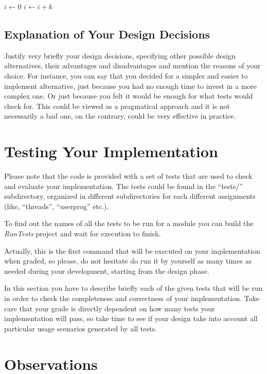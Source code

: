 \begin{algorithmic}
    \State $i\gets 0$
\Else
        \State $i\gets i+k$
    \EndIf
\EndIf
\end{algorithmic}

\subsection{Explanation of Your Design Decisions}

Justify very briefly your design decisions, specifying other possible design alternatives, their advantages and disadvantages and mention the reasons of your choice. For instance, you can say that you decided for a simpler and easier to implement alternative, just because you had no enough time to invest in a more complex one. Or just because you felt it would be enough for what \OSName{} tests would check for. This could be viewed as a pragmatical approach and it is not necessarily a bad one, on the contrary, could be very effective in practice.  


\section{Testing Your Implementation}

Please note that the \OSName{} code is provided with a set of tests that are used to check and evaluate your implementation. The \OSName{} tests could be found in the ``tests/'' subdirectory, organized in different subdirectories for each different assignments (like, ``threads'', ``userprog'' etc.).

To find out the names of all the tests to be run for a module you can build the \textit{RunTests} project and wait for execution to finish.

Actually, this is the first command that will be executed on your implementation when graded, so please, do not hesitate do run it by yourself as many times as needed during your \OSName{} development, starting from the design phase. 

In this section you have to describe briefly each of the given \OSName{} tests that will be run in order to check the completeness and correctness of your implementation. 
Take care that your grade is directly dependent on how many tests your implementation will pass, so take time to see if your design take into account all particular usage scenarios generated by all \OSName{} tests. 


\section{Observations}

